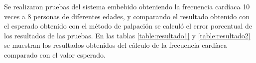\documentclass[journal]{IEEEtran}
\begin{document}
Se realizaron pruebas del sistema embebido obteniendo la frecuencia cardíaca 10 veces a 8 personas de diferentes edades, y comparando el resultado obtenido con el esperado obtenido con el método de palpación se calculó el error porcentual de los resultados de las pruebas. En las tablas \ref{table:resultado1} y \ref{table:resultado2} se muestran los resultados obtenidos del cálculo de la frecuencia cardíaca comparado con el valor esperado. \\

\begin{table}[htbp]
	\centering
	\qquad
	

\end{table}
\end{document}
